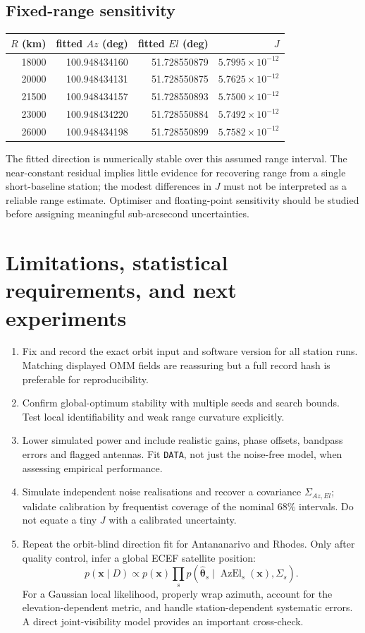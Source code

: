 \documentclass[11pt,a4paper]{article}
\begin{document}
\subsection{Fixed-range sensitivity}
\begin{center}\begin{tabular}{rrrr}
\toprule
$R$ (km)& fitted $Az$ (deg)& fitted $El$ (deg)&$J$\\\midrule
18000&100.948434160&51.728550879&$5.7995\times10^{-12}$\\
20000&100.948434131&51.728550875&$5.7625\times10^{-12}$\\
21500&100.948434157&51.728550893&$5.7500\times10^{-12}$\\
23000&100.948434220&51.728550884&$5.7492\times10^{-12}$\\
26000&100.948434198&51.728550899&$5.7582\times10^{-12}$\\\bottomrule
\end{tabular}\end{center}
The fitted direction is numerically stable over this assumed range interval.
The near-constant residual implies little evidence for recovering range
from a single short-baseline station; the modest differences in $J$
must not be interpreted as a reliable range estimate. Optimiser and
floating-point sensitivity should be studied before assigning meaningful
sub-arcsecond uncertainties.
\section{Limitations, statistical requirements, and next experiments}
\begin{enumerate}
\item Fix and record the exact orbit input and software version for
all station runs. Matching displayed OMM fields are reassuring but a full
record hash is preferable for reproducibility.
\item Confirm global-optimum stability with multiple seeds and search bounds.
Test local identifiability and weak range curvature explicitly.
\item Lower simulated power and include realistic gains, phase offsets,
bandpass errors and flagged antennas. Fit \texttt{DATA}, not just the
noise-free model, when assessing empirical performance.
\item Simulate independent noise realisations and recover a covariance
$\Sigma_{Az,El}$; validate calibration by frequentist coverage of the
nominal $68\%$ intervals. Do not equate a tiny $J$ with a calibrated
uncertainty.
\item Repeat the orbit-blind direction fit for Antananarivo and Rhodes.
Only after quality control, infer a global ECEF satellite position:
\begin{equation}
p(\mathbf x\mid D)\propto p(\mathbf x)
\prod_s p\!\left(\hat{\boldsymbol\theta}_s
\mid\operatorname{AzEl}_s(\mathbf x),\Sigma_s\right).
\end{equation}
For a Gaussian local likelihood, properly wrap azimuth, account for the
elevation-dependent metric, and handle station-dependent systematic errors.
A direct joint-visibility model provides an important cross-check.
\end{enumerate}
\end{document}
